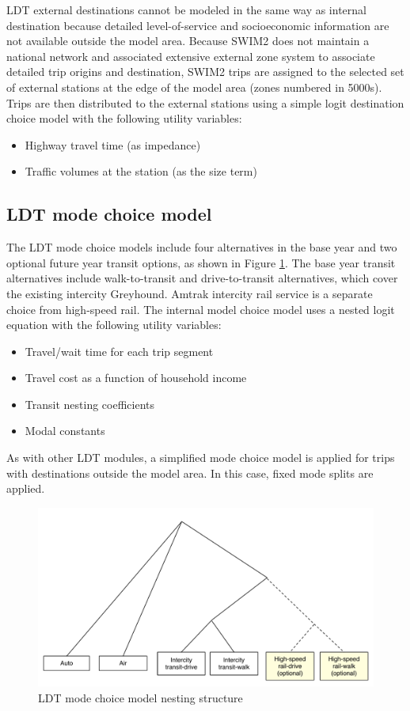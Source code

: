 LDT external destinations cannot be modeled in the same way as internal destination because detailed level-of-service and socioeconomic information are not available outside the model area. Because SWIM2 does not maintain a national network and associated extensive external zone system to associate detailed trip origins and destination, SWIM2 trips are assigned to the selected set of external stations at the edge of the model area (zones numbered in 5000s). Trips are then distributed to the external stations using a simple logit destination choice model with the following utility variables:
\begin{itemize}
\item Highway travel time (as impedance)
\item Traffic volumes at the station (as the size term)
\end{itemize}

\subsection{LDT mode choice model}
The LDT mode choice models include four alternatives in the base year and two optional future year transit options, as shown in Figure \ref{fig:mode-choice-model-nesting-structure}. The base year transit alternatives include walk-to-transit and drive-to-transit alternatives, which cover the existing intercity Greyhound. Amtrak intercity rail service is a separate choice from high-speed rail. The internal model choice model uses a nested logit equation with the following utility variables:
\begin{itemize}
\item Travel/wait time for each trip segment
\item Travel cost as a function of household income
\item Transit nesting coefficients
\item Modal constants
\end{itemize} 

\noindent As with other LDT modules, a simplified mode choice model is applied for trips with destinations outside the model area. In this case, fixed mode splits are applied.

\begin{figure}  %
\centering
\includegraphics[width=5.5in]{pt/mode-choice-model-nesting-structure}
\caption{LDT mode choice model nesting structure}
\label{fig:mode-choice-model-nesting-structure}
\end{figure}
 
